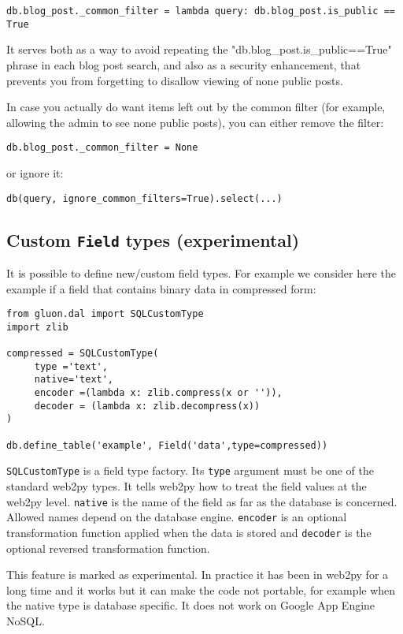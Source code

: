 \documentclass[justified,sixbynine,notoc]{tufte-book}
\def\ft{\small\tt}
\def\inxx#1{\index{#1}}
\begin{document}
\begin{fullwidth}
\begin{lstlisting}
db.blog_post._common_filter = lambda query: db.blog_post.is_public == True
\end{lstlisting}

It serves both as a way to avoid repeating the "db.blog\_post.is\_public==True" phrase in each blog post search, and also as a security enhancement, that prevents you from forgetting to disallow viewing of none public posts.

In case you actually do want items left out by the common filter (for example, allowing the admin to see none public posts), you can either remove the filter:
\begin{lstlisting}
db.blog_post._common_filter = None
\end{lstlisting}
or ignore it:
\begin{lstlisting}
db(query, ignore_common_filters=True).select(...)
\end{lstlisting}

\goodbreak\subsection{Custom {\ft Field} types (experimental)}

\inxx{SQLCustomType}

It is possible to define new/custom field types. For example we consider here the example if a field that contains binary data in compressed form:

\begin{lstlisting}
from gluon.dal import SQLCustomType
import zlib

compressed = SQLCustomType(
     type ='text',
     native='text',
     encoder =(lambda x: zlib.compress(x or '')),
     decoder = (lambda x: zlib.decompress(x))
)

db.define_table('example', Field('data',type=compressed))
\end{lstlisting}

{\ft SQLCustomType} is a field type factory. Its {\ft type} argument must be one of the standard web2py types. It tells web2py how to treat the field values at the web2py level. {\ft native} is the name of the field as far as the database is concerned. Allowed names depend on the database engine. {\ft encoder} is an optional transformation function applied when the data is stored and {\ft decoder} is the optional reversed transformation function.

This feature is marked as experimental. In practice it has been in web2py for a long time and it works but it can make the code not portable, for example when the native type is database specific. It does not work on Google App Engine NoSQL.


\end{fullwidth}
\end{document}
